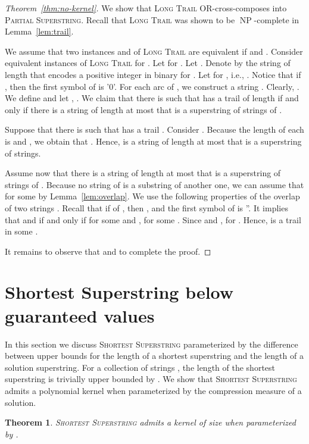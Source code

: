 \documentclass[11pt]{article}
\newtheorem{theorem}{Theorem}
\DeclareMathOperator{\operatorClassNP}{NP}
\newcommand{\classNP}{\ensuremath{\operatorClassNP}}
\begin{document}
 \begin{proof}[Theorem~\ref{thm:no-kernel}]
We show that \textsc{Long Trail} OR-cross-composes into \textsc{Partial Superstring}. Recall that \textsc{Long Trail} was shown to be \classNP-complete in Lemma~\ref{lem:trail}.

We assume that two instances  and  of  \textsc{Long Trail} are equivalent if  and .
Consider equivalent instances  of   \textsc{Long Trail} for . Let  for . 
Let . Denote by  the string of length  that encodes a positive integer  in binary for .  
Let  for , i.e., . Notice that if , then the first symbol of  is '0'. 
For each arc  of , we construct a string . 
Clearly, .
We define
 and let , . 
We claim that there is  such that  has a trail of length  if and only if there is a string  of length at most  that is a superstring of  strings of .

Suppose that  there is  such that  has a  trail  .  Consider . Because the length of each  is  and , we obtain that . Hence,  is a string of length at most  that is a superstring of  strings.

Assume now that there is a string  of length at most  that is a superstring of  strings of . Because no string of  is a substring of another one, we can assume that 
 for some  by Lemma~\ref{lem:overlap}.  
We use the following properties of the overlap of two strings . Recall that if  of , then ,  and 
the first symbol of  is ''. It implies that  and   if and only if  for some 
and ,  for some . Since  and ,  for .
Hence,   is a  trail in some .

It remains to observe that  and  to complete the proof. 
\end{proof}


\section{Shortest Superstring below guaranteed values}\label{sec:below}
In this section we discuss \textsc{Shortest Superstring} parameterized by the difference between upper bounds for the length of a shortest superstring and the length of a solution superstring.  
For a collection of strings , the length of the shortest superstring is trivially upper bounded by . We show that \textsc{Shortest Superstring} admits a polynomial kernel when parameterized by the compression measure of a solution.

\begin{theorem}\label{thm:kernel}
\textsc{Shortest Superstring} admits a kernel of size  when parameterized by .
\end{theorem}
\end{document}
